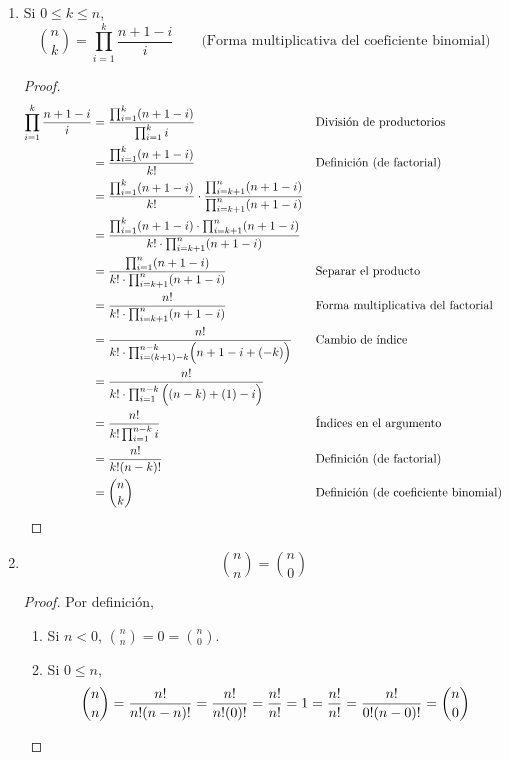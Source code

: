 \begin{enumerate}[label=\alph*)]
  \item Si $0\leq k \leq n$, \[\binom{n}{k} = \prod_{i=1}^{k} \frac{n+1-i}{i} \qquad \text{(Forma multiplicativa del coeficiente binomial)}\]
  
  \begin{proof}\leavevmode
    \begin{align*}
      \prod_{i=1}^{k} \frac{n+1-i}{i} &= \frac{\prod_{i=1}^{k} (n+1-i)}{\prod_{i=1}^{k} i} && \text{División de productorios}\\
      &= \frac{\prod_{i=1}^{k} (n+1-i)}{k!} && \text{Definición (de factorial)}\\
      &= \frac{\prod_{i=1}^{k} (n+1-i)}{k!} \cdot \frac{\prod_{i=k+1}^{n} (n+1-i)}{\prod_{i=k+1}^{n} (n+1-i)}\\
      &= \frac{\prod_{i=1}^{k} (n+1-i) \cdot \prod_{i=k+1}^{n} (n+1-i)}{k! \cdot \prod_{i=k+1}^{n} (n+1-i)}\\
      &= \frac{\prod_{i=1}^{n}(n+1-i)}{k! \cdot \prod_{i=k+1}^{n} (n+1-i)} && \text{Separar el producto}\\
      &= \frac{n!}{k! \cdot \prod_{i=k+1}^{n} (n+1-i)} && \text{Forma multiplicativa del factorial}\\
      &= \frac{n!}{k! \cdot \prod_{i=(k+1)-k}^{n-k} \Bigl(n+1-i+(-k)\Bigr)} && \text{Cambio de índice}\\
      &= \frac{n!}{k! \cdot \prod_{i=1}^{n-k} \Big((n-k)+(1)-i\Big)}\\
      &= \frac{n!}{k!\prod_{i=1}^{n-k} i} && \text{Índices en el argumento}\\
      &= \frac{n!}{k!(n-k)!} && \text{Definición (de factorial)}\\
      &= \binom{n}{k} && \text{Definición (de coeficiente binomial)} && \qedhere
    \end{align*}
  \end{proof}
  
  \item \[\binom{n}{n} = \binom{n}{0}\]
  \begin{proof}\leavevmode Por definición,
    \begin{enumerate}[label=\roman*)]
      \item Si $n<0$, $\binom{n}{n} = 0 = \binom{n}{0}$.
      \item Si $0\leq n$, \[\binom{n}{n} = \frac{n!}{n!(n-n)!} = \frac{n!}{n!(0)!} = \frac{n!}{n!} = 1 = \frac{n!}{n!} =\frac{n!}{0!(n-0)!} = \binom{n}{0}\qedhere\]
    \end{enumerate}
  \end{proof}
  

\end{enumerate}
